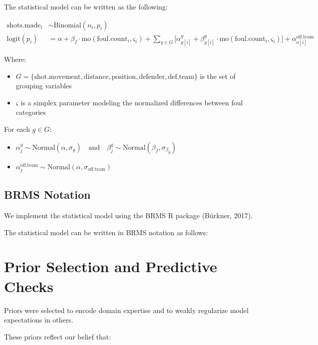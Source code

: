 \documentclass[
  letterpaper,
  DIV=11,
  numbers=noendperiod]{scrartcl}
\providecommand{\tightlist}{%
  \setlength{\itemsep}{0pt}\setlength{\parskip}{0pt}}\usepackage{longtable,booktabs,array}
\begin{document}
The statistical model can be written as the following:

\[ \begin{align}
\text{shots.made}_i &\sim \text{Binomial}(n_i, p_i) \\
\text{logit}(p_i) &= \alpha + \beta_{f} \cdot \text{mo}(\text{foul.count}_i, ς_i) + \sum_{g \in G} \Big[ \alpha^g_{g[i]} + \beta^g_{g[i]} \cdot \text{mo}(\text{foul.count}_i,ς_i) \Big] + \alpha^{\text{off.team}}_{o[i]}
\end{align}\]

Where:

\begin{itemize}
\tightlist
\item
  \(G = \{\text{shot.movement}, \text{distance}, \text{position}, \text{defender}, \text{def.team}\}\)
  is the set of grouping variables
\item
  \(ς\) is a simplex parameter modeling the normalized differences
  between foul categories
\end{itemize}

For each \(g \in G\):

\begin{itemize}
\item
  \(\alpha^g_j \sim \text{Normal}(\alpha, \sigma_g) \quad \text{and} \quad \beta^g_j \sim \text{Normal}(\beta_f, \sigma_{\beta_g})\)
\item
  \(\alpha^{\text{off.team}}_j \sim \text{Normal}(\alpha, \sigma_{\text{off.team}})\)
\end{itemize}

\subsection{BRMS Notation}\label{brms-notation}

We implement the statistical model using the BRMS R package (Bürkner,
2017).

The statistical model can be written in BRMS notation as follows:

\section{Prior Selection and Predictive
Checks}\label{prior-selection-and-predictive-checks}

Priors were selected to encode domain expertise and to weakly regularize
model expectations in others.

These priors reflect our belief that:
\end{document}

